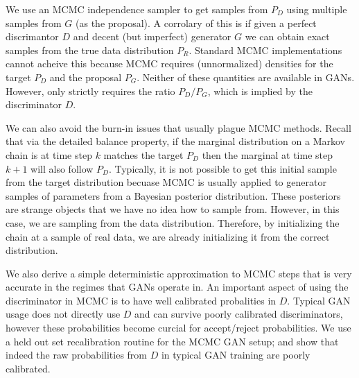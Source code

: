 We use an MCMC independence sampler to get samples from $P_D$ using multiple samples from $G$ (as the proposal)\@.
A corrolary of this is if given a perfect discrimantor $D$ and decent (but imperfect) generator $G$ we can obtain exact samples from the true data distribution $P_R$.
Standard MCMC implementations cannot acheive this because MCMC requires (unnormalized) densities for the target $P_D$ and the proposal $P_G$.
Neither of these quantities are available in GANs.
However, only strictly requires the ratio $P_D / P_G$, which is implied by the discriminator $D$.

We can also avoid the burn-in issues that usually plague MCMC methods.
Recall that via the detailed balance property, if the marginal distribution on a Markov chain is at time step $k$ matches the target $P_D$ then the marginal at time step $k+1$ will also follow $P_D$.
Typically, it is not possible to get this initial sample from the target distribution becuase MCMC is usually applied to generator samples of parameters from a Bayesian posterior distribution.
These posteriors are strange objects that we have no idea how to sample from.
However, in this case, we are sampling from the data distribution.
Therefore, by initializing the chain at a sample of real data, we are already initializing it from the correct distribution.

We also derive a simple deterministic approximation to MCMC steps that is very accurate in the regimes that GANs operate in.
An important aspect of using the discriminator in MCMC is to have well calibrated probalities in $D$.
Typical GAN usage does not directly use $D$ and can survive poorly calibrated discriminators, however these probabilities become curcial for accept/reject probabilities.
We use a held out set recalibration routine for the MCMC GAN setup; and show that indeed the raw probabilities from $D$ in typical GAN training are poorly calibrated.

